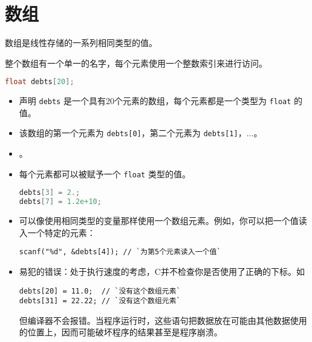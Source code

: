 \section{数组}
\begin{frame}[fragile]\ft{\secname}
数组是线性存储的一系列相同类型的值。

整个数组有一个单一的名字，每个元素使用一个整数索引来进行访问。
\end{frame}

\begin{frame}[fragile]
\begin{lstlisting}[language=c,backgroundcolor=\color{red!10}]
float debts[20];
\end{lstlisting}

\begin{itemize}
\item
声明 \lstinline|debts| 是一个具有20个元素的数组，每个元素都是一个类型为 \lstinline|float| 的值。\\[0.1in]
\item
该数组的第一个元素为 \lstinline|debts[0]|，第二个元素为 \lstinline|debts[1]|，...。\\[0.1in]
\item
{}。\\[0.1in]
\item 每个元素都可以被赋予一个 \lstinline|float| 类型的值。
\begin{lstlisting}[language=c,backgroundcolor=\color{red!10}]
debts[3] = 2.;
debts[7] = 1.2e+10;
\end{lstlisting}
\end{itemize}
\end{frame}

\begin{frame}[fragile]\ft{\secname}
\begin{itemize}
\item
可以像使用相同类型的变量那样使用一个数组元素。例如，你可以把一个值读入一个特定的元素：
\begin{lstlisting}
scanf("%d", &debts[4]); // `为第5个元素读入一个值`
\end{lstlisting} 
\end{itemize}

\end{frame}

\begin{frame}[fragile]\ft{\secname}
\begin{itemize}
\item
易犯的错误：处于执行速度的考虑，C并不检查你是否使用了正确的下标。如
\begin{lstlisting}
debts[20] = 11.0;  // `没有这个数组元素`
debts[31] = 22.22; // `没有这个数组元素`
\end{lstlisting}
但编译器不会报错。当程序运行时，这些语句把数据放在可能由其他数据使用的位置上，因而可能破坏程序的结果甚至是程序崩溃。
\end{itemize}
\end{frame}

